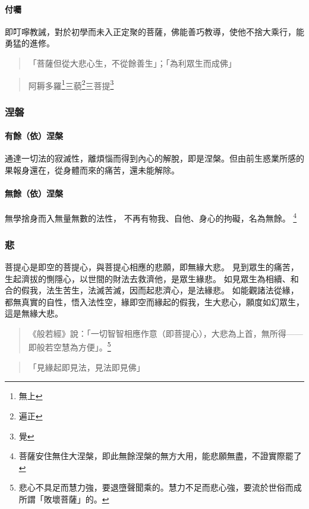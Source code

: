 \paragraph{付囑} 即叮嚀教誡，對於初學而未入正定聚的菩薩，佛能善巧教導，使他不捨大乘行，能勇猛的進修。

\begin{quote}
  「菩薩但從大悲心生，不從餘善生」；「為利眾生而成佛」
\end{quote}

\begin{quote}
  阿耨多羅\footnote{無上}三藐\footnote{遍正}三菩提\footnote{覺}
\end{quote}

\subsubsection{涅磐}
\paragraph{有餘（依）涅槃}
通達一切法的寂滅性，離煩惱而得到內心的解脫，即是涅槃。但由前生惑業所感的果報身還在，從身體而來的痛苦，還未能解除。
\paragraph{無餘（依）涅槃}
無學捨身而入無量無數的法性， 不再有物我、自他、身心的拘礙，名為無餘。
\footnote{菩薩安住無住大涅槃，即此無餘涅槃的無方大用，能悲願無盡，不證實際罷了}

\subsubsection{悲}
菩提心是即空的菩提心，與菩提心相應的悲願，即無緣大悲。
見到眾生的痛苦，生起濟拔的惻隱心，以世間的財法去救濟他，是眾生緣悲。
如見眾生為相續、和合的假我，法生苦生，法滅苦滅，因而起悲濟心，是法緣悲。
如能觀諸法從緣，都無真實的自性，悟入法性空，緣即空而緣起的假我，生大悲心，願度如幻眾生，這是無緣大悲。

\begin{quote}
《般若經》說：「一切智智相應作意（即菩提心），大悲為上首，無所得——即般若空慧為方便」。\footnote{悲心不具足而慧力強，要退墮聲聞乘的。慧力不足而悲心強，要流於世俗而成所謂「敗壞菩薩」的。}
\end{quote}


\begin{quote}
  「見緣起即見法，見法即見佛」
\end{quote}

